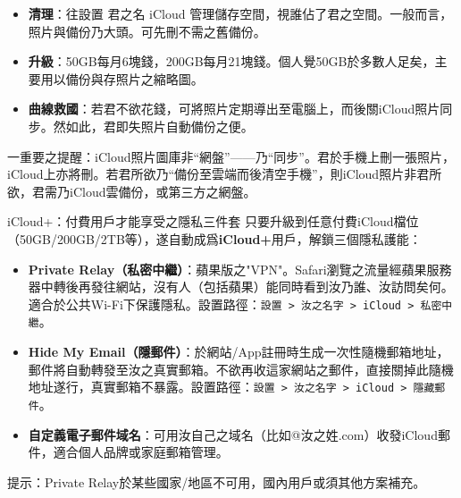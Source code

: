 \begin{itemize}
  \item \textbf{清理}：往設置 君之名 iCloud 管理儲存空間，視誰佔了君之空間。一般而言，照片與備份乃大頭。可先刪不需之舊備份。
  \item \textbf{升級}：50GB每月6塊錢，200GB每月21塊錢。個人覺50GB於多數人足矣，主要用以備份與存照片之縮略圖。
  \item \textbf{曲線救國}：若君不欲花錢，可將照片定期導出至電腦上，而後關iCloud照片同步。然如此，君即失照片自動備份之便。
\end{itemize}

一重要之提醒：iCloud照片圖庫非“網盤”——乃“同步”。君於手機上刪一張照片，iCloud上亦將刪。若君所欲乃“備份至雲端而後清空手機”，則iCloud照片非君所欲，君需乃iCloud雲備份，或第三方之網盤。

\begin{tcbinfo}{iCloud+：付費用戶才能享受之隱私三件套}
只要升級到任意付費iCloud檔位（50GB/200GB/2TB等），遂自動成爲\textbf{iCloud+}用戶，解鎖三個隱私護能：

\begin{itemize}
  \item \textbf{Private Relay（私密中繼）}：蘋果版之"VPN"。Safari瀏覽之流量經蘋果服務器中轉後再發往網站，沒有人（包括蘋果）能同時看到汝乃誰、汝訪問矣何。適合於公共Wi-Fi下保護隱私。設置路徑：\texttt{設置 > 汝之名字 > iCloud > 私密中繼}。
  \item \textbf{Hide My Email（隱郵件）}：於網站/App註冊時生成一次性隨機郵箱地址，郵件將自動轉發至汝之真實郵箱。不欲再收這家網站之郵件，直接關掉此隨機地址遂行，真實郵箱不暴露。設置路徑：\texttt{設置 > 汝之名字 > iCloud > 隱藏郵件}。
  \item \textbf{自定義電子郵件域名}：可用汝自己之域名（比如@汝之姓.com）收發iCloud郵件，適合個人品牌或家庭郵箱管理。
\end{itemize}

提示：Private Relay於某些國家/地區不可用，國內用戶或須其他方案補充。

\end{tcbinfo}

